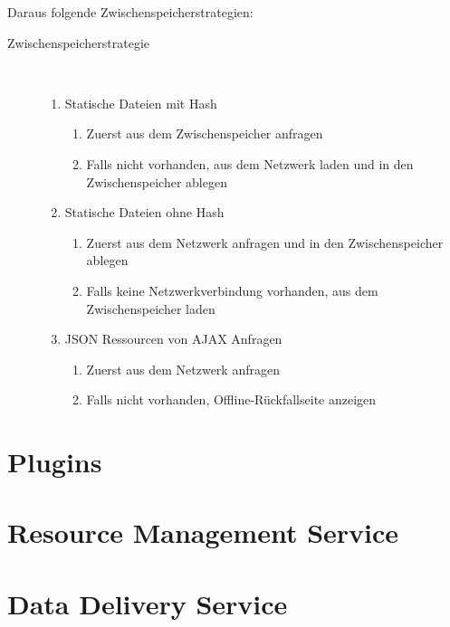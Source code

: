 Daraus folgende Zwischenspeicherstrategien:

\begin{description}
    \item[Zwischenspeicherstrategie]~\par
    \begin{enumerate}
       \item Statische Dateien mit Hash
       \begin{enumerate}
          \item Zuerst aus dem Zwischenspeicher anfragen
          \item Falls nicht vorhanden, aus dem Netzwerk laden und in den Zwischenspeicher ablegen
       \end{enumerate}
       \item Statische Dateien ohne Hash
       \begin{enumerate}
            \item Zuerst aus dem Netzwerk anfragen und in den Zwischenspeicher ablegen
            \item Falls keine Netzwerkverbindung vorhanden, aus dem Zwischenspeicher laden
        \end{enumerate}
        \item JSON Ressourcen von AJAX Anfragen
        \begin{enumerate}
             \item Zuerst aus dem Netzwerk anfragen
             \item Falls nicht vorhanden, Offline-Rückfallseite anzeigen 
         \end{enumerate}
    \end{enumerate}
 \end{description}

\section{Plugins}
\label{sec:plugins}

\section{Resource Management Service}
\label{sec:resourcemanagementservice}

\section{Data Delivery Service}
\label{sec:datadeliveryservice}

